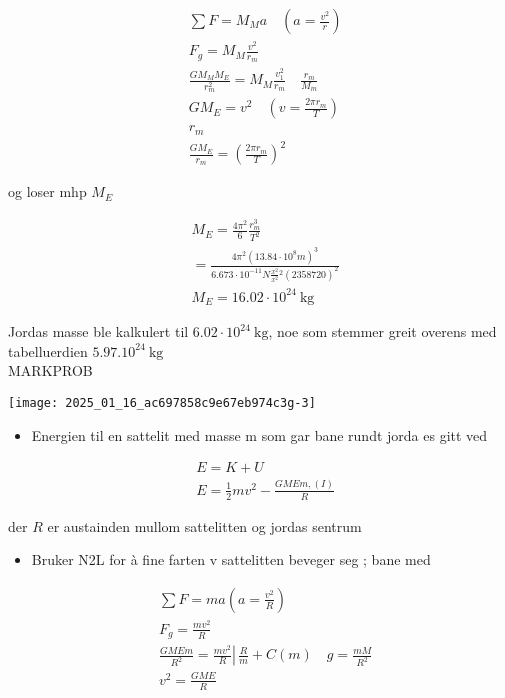 \documentclass[10pt]{article}
\begin{document}
$$
\begin{aligned}
& \sum F=M_{M} a \quad\left(a=\frac{v^{2}}{r}\right) \\
& F_{g}=M_{M} \frac{v^{2}}{r_{m}} \\
& \frac{G M_{M} M_{E}}{r_{m}^{2}}=M_{M} \frac{v_{1}^{2}}{r_{m}} \quad \frac{r_{m}}{M_{m}} \\
& G M_{E}=v^{2} \quad\left(v=\frac{2 \pi r_{m}}{T}\right) \\
& r_{m} \\
& \frac{G M_{E}}{r_{m}}=\left(\frac{2 \pi r_{m}}{T}\right)^{2}
\end{aligned}
$$

og loser mhp $M_{E}$

$$
\begin{aligned}
& M_{E}=\frac{4 \pi^{2}}{6} \frac{r_{m}^{3}}{T^{2}} \\
& =\frac{4 \pi^{2}\left(13.84 \cdot 10^{8} m\right)^{3}}{6.673 \cdot 10^{-11} N \frac{x^{2}}{x^{2}}{ }^{2}(2358720)^{2}} \\
& M_{E}=16.02 \cdot 10^{24} \mathrm{~kg}
\end{aligned}
$$

Jordas masse ble kalkulert til $6.02 \cdot 10^{24} \mathrm{~kg}$, noe som stemmer greit overens med tabelluerdien $5.97 .10^{24} \mathrm{~kg}$\\

MARKPROB

\texttt{[image: 2025\_01\_16\_ac697858c9e67eb974c3g-3]}

\begin{itemize}
  \item Energien til en sattelit med masse m som gar bane rundt jorda es gitt ved
\end{itemize}

$$
\begin{aligned}
& E=K+U \\
& E=\frac{1}{2} m v^{2}-\frac{G M E m,(I)}{R}
\end{aligned}
$$

der $R$ er austainden mullom sattelitten og jordas sentrum

\begin{itemize}
  \item Bruker N2L for à fine farten v sattelitten beveger seg ; bane med
\end{itemize}

$$
\begin{aligned}
& \sum F=m a\left(a=\frac{v^{2}}{R}\right) \\
& F_{g}=\frac{m v^{2}}{R} \\
& \frac{G M E m}{R^{2}}=\frac{m v^{2}}{R} \left\lvert\, \frac{R}{m}+C(m) \quad g=\frac{m M}{R^{2}}\right. \\
& v^{2}=\frac{G M E}{R}
\end{aligned}
$$
\end{document}
